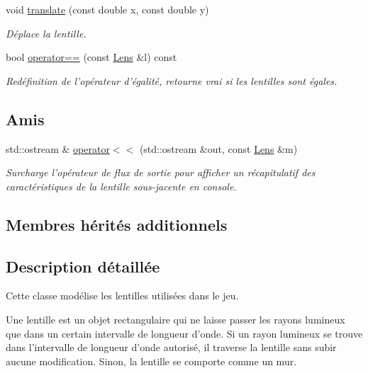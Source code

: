 \begin{DoxyCompactItemize}
void \hyperlink{classLens_acfdbf14808b0c555e21405aacd7d9cb2}{translate} (const double x, const double y)
\begin{DoxyCompactList}\small\item\em Déplace la lentille. \end{DoxyCompactList}\item 
bool \hyperlink{classLens_a53256728d15126197e0f66a595822948}{operator==} (const \hyperlink{classLens}{Lens} \&l) const 
\begin{DoxyCompactList}\small\item\em Redéfinition de l'opérateur d'égalité, retourne vrai si les lentilles sont égales. \end{DoxyCompactList}\end{DoxyCompactItemize}
\subsection*{Amis}
\begin{DoxyCompactItemize}
\item 
std\+::ostream \& \hyperlink{classLens_ad6aeaa87264bd2229fef327ef4c64699}{operator$<$$<$} (std\+::ostream \&out, const \hyperlink{classLens}{Lens} \&m)
\begin{DoxyCompactList}\small\item\em Surcharge l'opérateur de flux de sortie pour afficher un récapitulatif des caractéristiques de la lentille sous-\/jacente en console. \end{DoxyCompactList}\end{DoxyCompactItemize}
\subsection*{Membres hérités additionnels}


\subsection{Description détaillée}
Cette classe modélise les lentilles utilisées dans le jeu. 

Une lentille est un objet rectangulaire qui ne laisse passer les rayons lumineux que dans un certain intervalle de longueur d'onde. Si un rayon lumineux se trouve dans l'intervalle de longueur d'onde autorisé, il traverse la lentille sans subir aucune modification. Sinon, la lentille se comporte comme un mur. 

